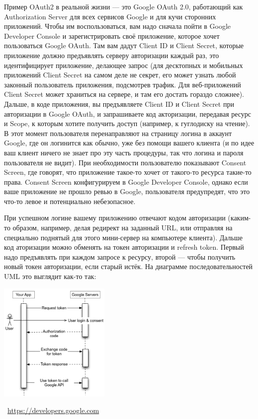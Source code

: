\documentclass[a5paper]{article}
\newcommand{\attribution}[1] {
\vspace{-5mm}\begin{flushright}\begin{scriptsize}\textcolor{gray}{\textcopyright\, #1}\end{scriptsize}\end{flushright}
}
\begin{document}
Пример OAuth2 в реальной жизни --- это Google OAuth 2.0, работающий как Authorization Server для всех сервисов Google и для кучи сторонних приложений. Чтобы им воспользоваться, вам надо сначала пойти в Google Developer Console и зарегистрировать своё приложение, которое хочет пользоваться Google OAuth. Там вам дадут Client ID и Client Secret, которые приложение должно предъявлять серверу авторизации каждый раз, это идентифицирует приложение, делающее запрос (для десктопных и мобильных приложений Client Secret на самом деле не секрет, его может узнать любой законный пользователь приложения, подсмотрев трафик. Для веб-приложений Client Secret может храниться на сервере, и там его достать гораздо сложнее). Дальше, в коде приложения, вы предъявляете Client ID и Client Secret при авторизации в Google OAuth, и запрашиваете код акторизации, передавая ресурс и Scope, к которым хотите получить доступ (например, к гуглодиску на чтение). В этот момент пользователя перенаправляют на страницу логина в аккаунт Google, где он логинится как обычно, уже без помощи вашего клиента (и по идее ваш клиент ничего не знает про эту часть процедуры, так что логина и пароля пользователя не видит). При необходимости пользователю показывают Consent Screen, где говорят, что приложение такое-то хочет от такого-то ресурса такие-то права. Consent Screen конфигурируем в Google Developer Console, однако если ваше приложение не прошло ревью в Google, пользователя предупредят, что это что-то левое и потенциально небезопасное.

При успешном логине вашему приложению отвечают кодом авторизации (каким-то образом, например, делая редирект на заданный URL, или отправляя на специально поднятый для этого мини-сервер на компьютере клиента). Дальше код аторизации можно обменять на токен авторизации и refresh token. Первый надо предъявлять при каждом запросе к ресурсу, второй --- чтобы получить новый токен авторизации, если старый истёк. На диаграмме последовательностей UML это выглядит как-то так:

\begin{center}
    \includegraphics[width=0.4\textwidth]{googleOAuth.png}
    \attribution{\url{https://developers.google.com}}
\end{center}
\end{document}
